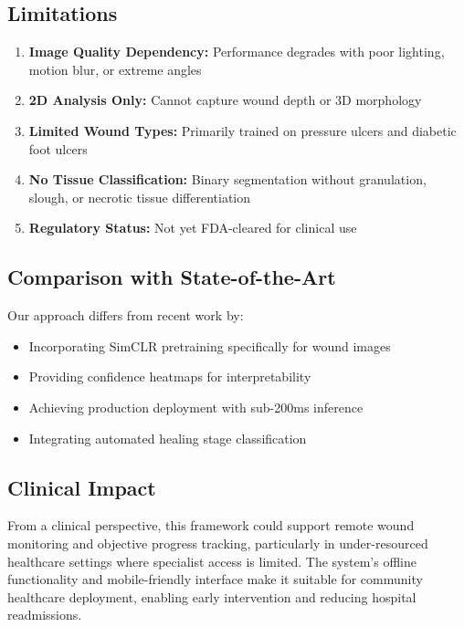 \documentclass[conference]{IEEEtran}
\begin{document}
\subsection{Limitations}
\begin{enumerate}
    \item \textbf{Image Quality Dependency:} Performance degrades with poor lighting, motion blur, or extreme angles
    \item \textbf{2D Analysis Only:} Cannot capture wound depth or 3D morphology
    \item \textbf{Limited Wound Types:} Primarily trained on pressure ulcers and diabetic foot ulcers
    \item \textbf{No Tissue Classification:} Binary segmentation without granulation, slough, or necrotic tissue differentiation
    \item \textbf{Regulatory Status:} Not yet FDA-cleared for clinical use
\end{enumerate}

\subsection{Comparison with State-of-the-Art}
Our approach differs from recent work \cite{recent_wound_1, recent_wound_2} by:
\begin{itemize}
    \item Incorporating SimCLR pretraining specifically for wound images
    \item Providing confidence heatmaps for interpretability
    \item Achieving production deployment with sub-200ms inference
    \item Integrating automated healing stage classification
\end{itemize}

\subsection{Clinical Impact}
From a clinical perspective, this framework could support remote wound monitoring and objective progress tracking, particularly in under-resourced healthcare settings where specialist access is limited. The system's offline functionality and mobile-friendly interface make it suitable for community healthcare deployment, enabling early intervention and reducing hospital readmissions.
\end{document}
